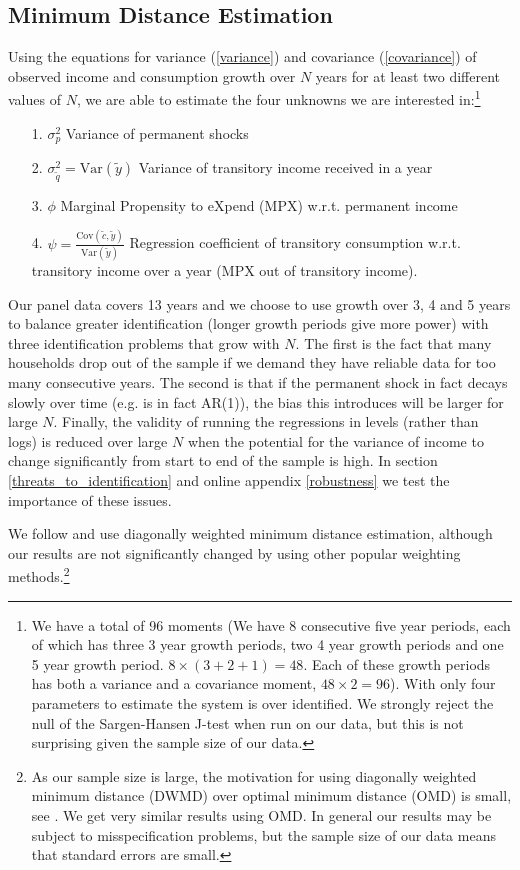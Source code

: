 \documentclass[titlepage]{\econtex}\newcommand{\texname}{ConsumptionHeterogeneity}
\begin{document}
\subsection{Minimum Distance Estimation}
Using the equations for variance (\ref{variance}) and covariance (\ref{covariance}) of observed income and consumption growth over $N$ years for at least two different values of $N$, we are able to estimate the four unknowns we are interested in:\footnote{We have a total of 96 moments (We have 8 consecutive five year periods, each of which has three 3 year growth periods, two 4 year growth periods and one 5 year growth period. $8\times(3+2+1)=48$. Each of these growth periods has both a variance and a covariance moment, $48\times 2 = 96$). With only four parameters to estimate the system is over identified. We strongly reject the null of the Sargen-Hansen J-test when run on our data, but this is not surprising given the sample size of our data.}
	\begin{itemize}
	\item[1.] $\sigma^2_p$ Variance of permanent shocks
	\item[2.] $\sigma^2_{\tilde{q}} = \mathrm{Var}(\tilde{y})$ Variance of transitory income received in a year
	\item[3.] $\phi$ Marginal Propensity to eXpend (MPX) w.r.t. permanent income
	\item[4.] $\psi = \frac{\mathrm{Cov}(\tilde{c},\tilde{y})}{\mathrm{Var}(\tilde{y})}$ Regression coefficient of transitory consumption w.r.t. transitory income over a year (MPX out of transitory income).
\end{itemize}
Our panel data covers 13 years and we choose to use growth over 3, 4 and 5 years to balance greater identification (longer growth periods give more power) with three identification problems that grow with $N$. The first is the fact that many households drop out of the sample if we demand they have reliable data for too many consecutive years. The second is that if the permanent shock in fact decays slowly over time (e.g. is in fact AR(1)), the bias this introduces will be larger for large $N$. Finally, the validity of running the regressions in levels (rather than logs) is reduced over large $N$ when the potential for the variance of income to change significantly from start to end of the sample is high. In section \ref{threats_to_identification} and online appendix \ref{robustness} we test the importance of these issues.

We follow \cite{blundell_consumption_2008} and use diagonally weighted minimum distance estimation, although our results are not significantly changed by using other popular weighting methods.\footnote{As our sample size is large, the motivation for using diagonally weighted minimum distance (DWMD) over optimal minimum distance (OMD) is small, see \cite{altonji_small-sample_1996}. We get very similar results using OMD. In general our results may be subject to misspecification problems, but the sample size of our data means that standard errors are small.}
\end{document}
